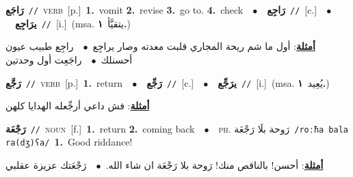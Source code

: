 \documentclass[10pt,a4paper,twoside]{article} %
\begin{document}
\begin{multicols}{2}
{\setlength\topsep{0pt}\textbf{\foreignlanguage{arabic}{رَاجَع}}\ {\color{gray}\texttt{//}\color{black}}\ \textsc{verb}\ [p.]\ \textbf{1.}~vomit  \textbf{2.}~revise  \textbf{3.}~go to.  \textbf{4.}~check\ \ $\bullet$\ \ \setlength\topsep{0pt}\textbf{\foreignlanguage{arabic}{رَاجِع}}\ {\color{gray}\texttt{//}\color{black}}\ [c.]\ \ $\bullet$\ \ \setlength\topsep{0pt}\textbf{\foreignlanguage{arabic}{يرَاجِع}}\ {\color{gray}\texttt{//}\color{black}}\ [i.]\ \color{gray}(msa. \foreignlanguage{arabic}{يتقيَّأ}~\foreignlanguage{arabic}{\textbf{١.}})\color{black}\  \begin{flushright}\color{gray}\foreignlanguage{arabic}{\textbf{\underline{\foreignlanguage{arabic}{أمثلة}}}: أول ما شم ريحة المجاري قلبت معدته وصار يراجِع\ $\bullet$\ \  راجِع طبيب عيون أحسنلك\ $\bullet$\ \  راجَعِت أول وحدتين}\end{flushright}\color{black}} \vspace{2mm}

{\setlength\topsep{0pt}\textbf{\foreignlanguage{arabic}{رَجَّع}}\ {\color{gray}\texttt{//}\color{black}}\ \textsc{verb}\ [p.]\ \textbf{1.}~return\ \ $\bullet$\ \ \setlength\topsep{0pt}\textbf{\foreignlanguage{arabic}{رَجِّع}}\ {\color{gray}\texttt{//}\color{black}}\ [c.]\ \ $\bullet$\ \ \setlength\topsep{0pt}\textbf{\foreignlanguage{arabic}{يرَجِّع}}\ {\color{gray}\texttt{//}\color{black}}\ [i.]\ \color{gray}(msa. \foreignlanguage{arabic}{يُعِيد}~\foreignlanguage{arabic}{\textbf{١.}})\color{black}\  \begin{flushright}\color{gray}\foreignlanguage{arabic}{\textbf{\underline{\foreignlanguage{arabic}{أمثلة}}}: فش داعي أرجِّعله الهدايا كلهن}\end{flushright}\color{black}} \vspace{2mm}

{\setlength\topsep{0pt}\textbf{\foreignlanguage{arabic}{رَجْعَة}}\ {\color{gray}\texttt{//}\color{black}}\ \textsc{noun}\ [f.]\ \textbf{1.}~return  \textbf{2.}~coming back\ \ $\bullet$\ \ \textsc{ph.} \color{gray} \foreignlanguage{arabic}{رَوحة بلَا رَجْعَة}\color{black}\ {\color{gray}\texttt{/{\sffamily roːħa bala ra(dʒ)ʕa}/}\color{black}}\ \textbf{1.}~Good riddance!\  \begin{flushright}\color{gray}\foreignlanguage{arabic}{\textbf{\underline{\foreignlanguage{arabic}{أمثلة}}}: أحسن! بالناقص منك! رَوحة بلا رَجْعَة ان شاء الله.\ $\bullet$\ \  رَجْعَتك عزيزة عقلبي}\end{flushright}\color{black}} \vspace{2mm}


\end{multicols}
\end{document}

